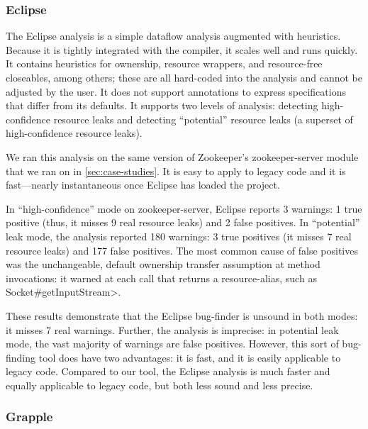\subsubsection{Eclipse}
\label{sec:eclipse}

The Eclipse analysis is a simple dataflow analysis
augmented with heuristics. Because it is tightly integrated with
the compiler, it scales well and runs quickly. It contains
heuristics for ownership, resource wrappers, and resource-free
closeables, among others; these are all hard-coded into the analysis and cannot
be adjusted by the user. It does not support annotations to express
specifications that differ from its defaults.
It supports two levels of analysis: detecting high-confidence resource
leaks and detecting ``potential'' resource
leaks (a superset of high-confidence resource leaks).

We ran this analysis on the same version of Zookeeper's zookeeper-server
module that we ran \Tool on in \cref{sec:case-studies}. It is easy to apply
to legacy code and it is fast---nearly instantaneous once Eclipse
has loaded the project.

In ``high-confidence'' mode on zookeeper-server, Eclipse reports 3
warnings: 1 true positive (thus, it misses 9 real resource leaks) and 2
false positives.
In ``potential'' leak mode, the analysis reported 180
warnings:  3 true positives (it misses 7 real resource leaks) and 177 false
positives.
The most common cause of false
positives was the unchangeable, default ownership transfer assumption
at method invocations: it warned at each call that returns a resource-alias, such as
\<Socket\#getInputStream>.

These results demonstrate that the Eclipse bug-finder is unsound in both
modes: it misses 7 real warnings. Further, the analysis is imprecise: in potential leak mode,
the vast majority of warnings are false positives. However, this sort
of bug-finding tool does have two advantages: it is fast, and it is easily
applicable to legacy code. Compared to our tool, the Eclipse analysis
is much faster and equally applicable to legacy code, but both less sound
and less precise.


\subsubsection{Grapple}
\label{sec:grapple}


